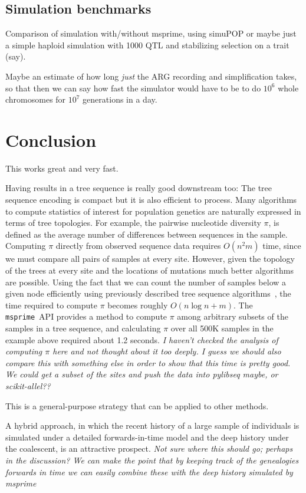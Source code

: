 \documentclass{article}
\newcommand{\msprime}{\texttt{msprime}}
\newcommand{\jk}[1]{{\em \color{red} #1}}
\begin{document}
\subsection*{Simulation benchmarks}

Comparison of simulation with/without msprime, using simuPOP
or maybe just a simple haploid simulation with 1000 QTL and stabilizing selection on a trait (say).

Maybe an estimate of how long \emph{just} the ARG recording and simplification takes,
so that then we can say how fast the simulator would have to be to do $10^6$ whole chromosomes for $10^7$ generations
in a day.


\section*{Conclusion}


This works great and very fast.

Having results in a tree sequence is really good downstream too:
The tree sequence encoding is compact but it is also efficient to process.
Many algorithms to compute statistics of interest for population genetics
are naturally expressed in terms of tree topologies. For example, the
pairwise nucleotide diversity $\pi$, is defined as the average number of
differences between sequences in the sample. Computing $\pi$ directly
from observed sequence data requires $O(n^2 m)$ time, since we must
compare all pairs of samples at every site. However, given the topology of
the trees at every site and the locations of mutations much better algorithms
are possible. Using the fact that we can count the number of samples below
a given node efficiently using previously described tree sequence
algorithms~\citep{kelleher2016efficient}, the time required to compute $\pi$
becomes roughly $O(n \log n + m)$.
The \msprime\ API provides a method to compute $\pi$ among arbitrary subsets of the
samples in a tree sequence, and calculating $\pi$ over all 500K samples
in the example above required about 1.2 seconds.
\jk{I haven't checked the analysis of computing $\pi$ here and not thought about
it too deeply. I guess we should also compare this with something else in order to
show that this time is pretty good. We could get a subset of the sites and push
the data into pylibseq maybe, or scikit-allel??}

This is a general-purpose strategy that can be applied to other methods.

A hybrid approach, in which the recent history of a large sample of
individuals is simulated under a detailed forwards-in-time model and the deep history
under the coalescent, is an attractive prospect.
\jk{Not sure where this should go; perhaps in the discussion? We can make the point that
by keeping track of the genealogies forwards in time we can easily combine these with the
deep history simulated by msprime}
\end{document}
